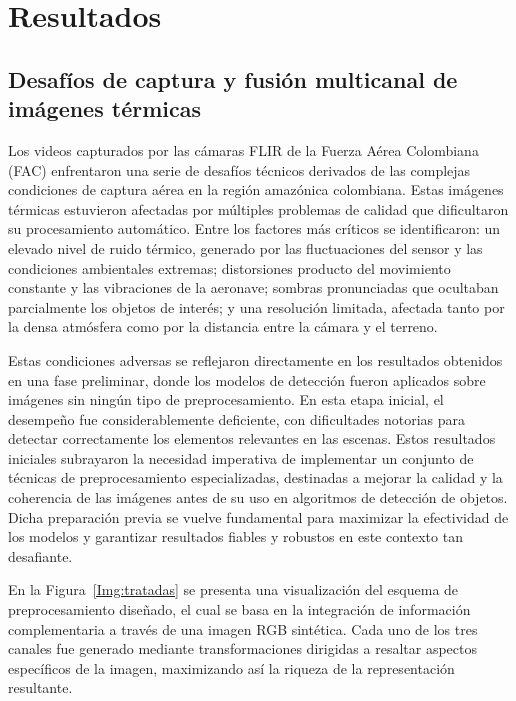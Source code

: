 \section{Resultados}

\subsection{Desafíos de captura y fusión multicanal de imágenes térmicas}

Los videos capturados por las cámaras FLIR de la Fuerza Aérea Colombiana (FAC) enfrentaron una serie de desafíos técnicos derivados de las complejas condiciones de captura aérea en la región amazónica colombiana. Estas imágenes térmicas estuvieron afectadas por múltiples problemas de calidad que dificultaron su procesamiento automático. Entre los factores más críticos se identificaron: un elevado nivel de ruido térmico, generado por las fluctuaciones del sensor y las condiciones ambientales extremas; distorsiones producto del movimiento constante y las vibraciones de la aeronave; sombras pronunciadas que ocultaban parcialmente los objetos de interés; y una resolución limitada, afectada tanto por la densa atmósfera como por la distancia entre la cámara y el terreno.

Estas condiciones adversas se reflejaron directamente en los resultados obtenidos en una fase preliminar, donde los modelos de detección fueron aplicados sobre imágenes sin ningún tipo de preprocesamiento. En esta etapa inicial, el desempeño fue considerablemente deficiente, con dificultades notorias para detectar correctamente los elementos relevantes en las escenas. Estos resultados iniciales subrayaron la necesidad imperativa de implementar un conjunto de técnicas de preprocesamiento especializadas, destinadas a mejorar la calidad y la coherencia de las imágenes antes de su uso en algoritmos de detección de objetos. Dicha preparación previa se vuelve fundamental para maximizar la efectividad de los modelos y garantizar resultados fiables y robustos en este contexto tan desafiante.

En la Figura~\ref{Img:tratadas} se presenta una visualización del esquema de preprocesamiento diseñado, el cual se basa en la integración de información complementaria a través de una imagen RGB sintética. Cada uno de los tres canales fue generado mediante transformaciones dirigidas a resaltar aspectos específicos de la imagen, maximizando así la riqueza de la representación resultante.

